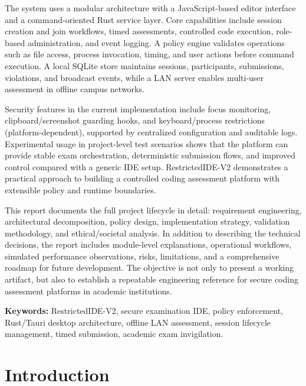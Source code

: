 \documentclass[12pt,a4paper]{report}
\begin{document}
	The system uses a modular architecture with a JavaScript-based editor interface and a command-oriented Rust service layer. Core capabilities include session creation and join workflows, timed assessments, controlled code execution, role-based administration, and event logging. A policy engine validates operations such as file access, process invocation, timing, and user actions before command execution. A local SQLite store maintains sessions, participants, submissions, violations, and broadcast events, while a LAN server enables multi-user assessment in offline campus networks.
	
	Security features in the current implementation include focus monitoring, clipboard/screenshot guarding hooks, and keyboard/process restrictions (platform-dependent), supported by centralized configuration and auditable logs. Experimental usage in project-level test scenarios shows that the platform can provide stable exam orchestration, deterministic submission flows, and improved control compared with a generic IDE setup. RestrictedIDE-V2 demonstrates a practical approach to building a controlled coding assessment platform with extensible policy and runtime boundaries.
	
	This report documents the full project lifecycle in detail: requirement engineering, architectural decomposition, policy design, implementation strategy, validation methodology, and ethical/societal analysis. In addition to describing the technical decisions, the report includes module-level explanations, operational workflows, simulated performance observations, risks, limitations, and a comprehensive roadmap for future development. The objective is not only to present a working artifact, but also to establish a repeatable engineering reference for secure coding assessment platforms in academic institutions.
	
	\textbf{Keywords:} RestrictedIDE-V2, secure examination IDE, policy enforcement, Rust/Tauri desktop architecture, offline LAN assessment, session lifecycle management, timed submission, academic exam invigilation.
	
	\tableofcontents
	\listoftables
	\listoffigures
	
	\clearpage
	
	\chapter{Introduction}
	
\end{document}
